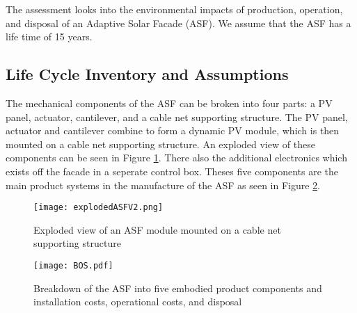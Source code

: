 
The assessment looks into the environmental impacts of production, operation, and disposal of an Adaptive Solar Facade (ASF). We assume that the ASF has a life time of 15 years.

\subsection{Life Cycle Inventory and Assumptions}

The mechanical components of the ASF can be broken into four parts: a PV panel, actuator, cantilever, and a cable net supporting structure. The PV panel, actuator and cantilever combine to form a dynamic PV module, which is then mounted on a cable net supporting structure. An exploded view of these components can be seen in Figure \ref{fig:explodedView}. There also the additional electronics which exists off the facade in a seperate control box. Theses five components are the main product systems in the manufacture of the ASF as seen in Figure \ref{fig:BOS}. 



\begin{figure}[H]
\begin{center}
\texttt{[image: explodedASFV2.png]}
\caption{Exploded view of an ASF module mounted on a cable net supporting structure}
\label{fig:explodedView}
\end{center}
\end{figure}

\begin{figure}[ht]
\begin{center}
\texttt{[image: BOS.pdf]}
\caption{Breakdown of the ASF into five embodied product components and installation costs, operational costs, and disposal}
\label{fig:BOS}
\end{center}
\end{figure}

